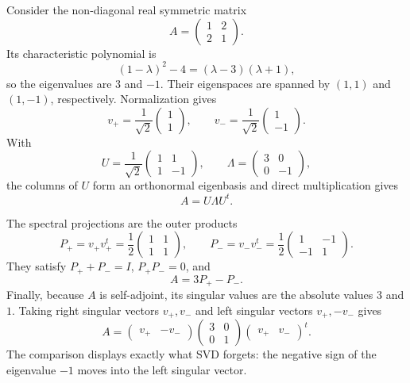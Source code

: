 \begin{example}
Consider the non-diagonal real symmetric matrix
\[
A=\begin{pmatrix}1&2\\2&1\end{pmatrix}.
\]
Its characteristic polynomial is
\[
(1-\lambda)^2-4=(\lambda-3)(\lambda+1),
\]
so the eigenvalues are \(3\) and \(-1\).  Their eigenspaces are spanned by
\((1,1)\) and \((1,-1)\), respectively.  Normalization gives
\[
v_+=\frac1{\sqrt2}\begin{pmatrix}1\\1\end{pmatrix},
\qquad
v_-=\frac1{\sqrt2}\begin{pmatrix}1\\-1\end{pmatrix}.
\]
With
\[
U=\frac1{\sqrt2}\begin{pmatrix}1&1\\1&-1\end{pmatrix},
\qquad
\Lambda=\begin{pmatrix}3&0\\0&-1\end{pmatrix},
\]
the columns of \(U\) form an orthonormal eigenbasis and direct multiplication
gives
\[
A=U\Lambda U^t.
\]

The spectral projections are the outer products
\[
P_+=v_+v_+^t=\frac12\begin{pmatrix}1&1\\1&1\end{pmatrix},
\qquad
P_-=v_-v_-^t=\frac12\begin{pmatrix}1&-1\\-1&1\end{pmatrix}.
\]
They satisfy \(P_++P_-=I\), \(P_+P_-=0\), and
\[
A=3P_+-P_-.
\]
Finally, because \(A\) is self-adjoint, its singular values are the absolute
values \(3\) and \(1\).  Taking right singular vectors \(v_+,v_-\) and left
singular vectors \(v_+,-v_-\) gives
\[
A=
\begin{pmatrix}v_+&-v_-\end{pmatrix}
\begin{pmatrix}3&0\\0&1\end{pmatrix}
\begin{pmatrix}v_+&v_-\end{pmatrix}^{t}.
\]
The comparison displays exactly what SVD forgets: the negative sign of the
eigenvalue \(-1\) moves into the left singular vector.
\end{example}

